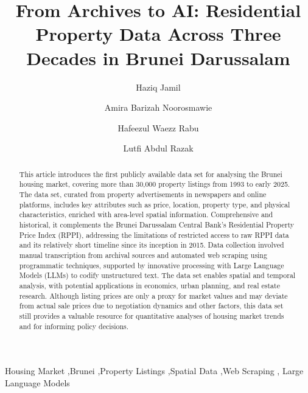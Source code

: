 \documentclass[
  number]{elsarticle}
\begin{document}
\begin{frontmatter}
\title{From Archives to AI: Residential Property Data Across Three
Decades in Brunei Darussalam}
\author[1]{Haziq Jamil%
%
}
\author[1]{Amira Barizah Noorosmawie%
%
}

\author[1]{Hafeezul Waezz Rabu%
%
}

\author[2]{Lutfi Abdul Razak%
%
}






        
\makeatletter
\def\@elsuads{\url{https://bruneiverse.github.io/house-data}}
\makeatother

\begin{abstract}
This article introduces the first publicly available data set for
analysing the Brunei housing market, covering more than 30,000 property
listings from 1993 to early 2025. The data set, curated from property
advertisements in newspapers and online platforms, includes key
attributes such as price, location, property type, and physical
characteristics, enriched with area-level spatial information.
Comprehensive and historical, it complements the Brunei Darussalam
Central Bank's Residential Property Price Index (RPPI), addressing the
limitations of restricted access to raw RPPI data and its relatively
short timeline since its inception in 2015. Data collection involved
manual transcription from archival sources and automated web scraping
using programmatic techniques, supported by innovative processing with
Large Language Models (LLMs) to codify unstructured text. The data set
enables spatial and temporal analysis, with potential applications in
economics, urban planning, and real estate research. Although listing
prices are only a proxy for market values and may deviate from actual
sale prices due to negotiation dynamics and other factors, this data set
still provides a valuable resource for quantitative analyses of housing
market trends and for informing policy decisions.
\end{abstract}





\begin{keyword}
    Housing Market \sep Brunei \sep Property Listings \sep Spatial
Data \sep Web Scraping \sep 
    Large Language Models
\end{keyword}
\end{frontmatter}
    
\end{document}
